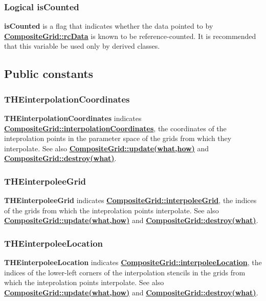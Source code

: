 \documentclass{article}
\begin{document}
  \subsubsection{Logical isCounted}
  \label{CompositeGrid::isCounted}
    \textbf{isCounted} is
    a flag that indicates whether the data pointed to by {\bf{}\hyperref{rcData}{rcData \rm(\S}{)}{CompositeGrid::rcData}} is known to be reference-counted.
    It is recommended that this variable be used only by derived classes.

\subsection{Public constants}
\label{CompositeGrid::PublicConstants}

  \subsubsection{THEinterpolationCoordinates}
  \label{CompositeGrid::THEinterpolationCoordinates}
    \textbf{THEinterpolationCoordinates} indicates
    {\bf{}\hyperref{interpolationCoordinates}{interpolationCoordinates \rm(\S}{)}{CompositeGrid::interpolationCoordinates}},
    the coordinates of the inteprolation points in the parameter space of the grids from which they interpolate.
    See also {\bf{}\hyperref{update(what,how)}{update(what,how) \rm(\S}{)}{CompositeGrid::update(what,how)}}
    and {\bf{}\hyperref{destroy(what)}{destroy(what) \rm(\S}{)}{CompositeGrid::destroy(what)}}.

  \subsubsection{THEinterpoleeGrid}
  \label{CompositeGrid::THEinterpoleeGrid}
    \textbf{THEinterpoleeGrid} indicates {\bf{}\hyperref{interpoleeGrid}{interpoleeGrid \rm(\S}{)}{CompositeGrid::interpoleeGrid}},
    the indices of the grids from which the inteprolation points interpolate.
    See also {\bf{}\hyperref{update(what,how)}{update(what,how) \rm(\S}{)}{CompositeGrid::update(what,how)}}
    and {\bf{}\hyperref{destroy(what)}{destroy(what) \rm(\S}{)}{CompositeGrid::destroy(what)}}.

  \subsubsection{THEinterpoleeLocation}
  \label{CompositeGrid::THEinterpoleeLocation}
    \textbf{THEinterpoleeLocation} indicates {\bf{}\hyperref{interpoleeLocation}{interpoleeLocation \rm(\S}{)}{CompositeGrid::interpoleeLocation}},
    the indices of the lower-left corners of the interpolation stencils
    in the grids from which the inteprolation points interpolate.
    See also {\bf{}\hyperref{update(what,how)}{update(what,how) \rm(\S}{)}{CompositeGrid::update(what,how)}}
    and {\bf{}\hyperref{destroy(what)}{destroy(what) \rm(\S}{)}{CompositeGrid::destroy(what)}}.
\end{document}
